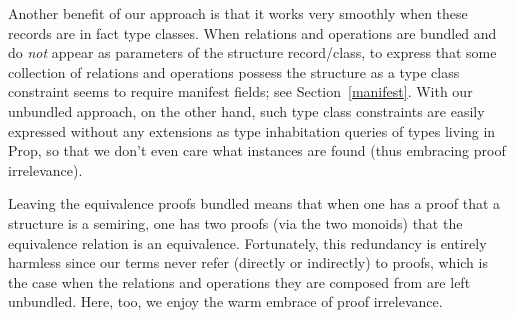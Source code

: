 \documentclass[a4paper,10pt,runningheads]{llncs}
\begin{document}
% 

Another benefit of our approach is that it works very smoothly when these records are in fact type
classes. When relations and operations are bundled and do \emph{not} appear as parameters of the
structure record/class, to express that some collection of relations and
operations possess the structure as a type class constraint seems to require manifest fields; see
Section~\ref{manifest}. With
our unbundled approach, on the other hand, such type class constraints are easily expressed without
any extensions as type inhabitation queries
of types living in Prop, so that we don't even care what instances are found (thus embracing proof
irrelevance).

Leaving the equivalence proofs bundled means that when one has a proof that a structure
is a semiring, one has two proofs (via the two monoids) that the equivalence relation is an
equivalence. Fortunately, this redundancy is entirely harmless since our terms
never refer (directly or indirectly) to proofs, which is the case when the relations and operations
they are composed from are left unbundled. Here, too, we enjoy the warm embrace of proof
irrelevance.
\end{document}
